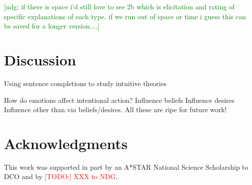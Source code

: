 \documentclass[10pt,letterpaper]{article}
\newcommand{\red}[1]{\textcolor{Red}{#1}}
\newcommand{\ndg}[1]{\textcolor{Green}{[ndg: #1]}}
\begin{document}
\ndg{if there is space i'd still love to see 2b which is elicitation and rating of specific explanations of each type. if we run out of space or time i guess this can be saved for a longer version....}



\section{Discussion}

Using sentence completions to study intuitive theories

How do emotions affect intentional action?
Influence beliefs
Influence desires
Influence other than via beliefs/desires.
All these are ripe for future work!


\section{Acknowledgments}

This work was supported in part by an A*STAR National Science Scholarship to DCO and by \red{[TODO:] XXX to NDG}.




\setlength{\bibleftmargin}{.125in}
\setlength{\bibindent}{-\bibleftmargin}


\end{document}
